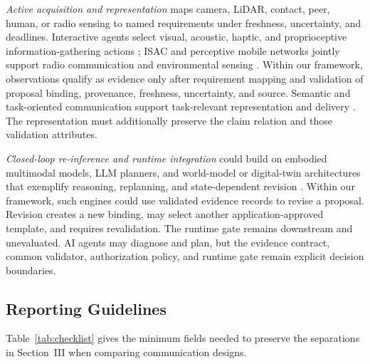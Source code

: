 \emph{Active acquisition and representation} maps camera, LiDAR, contact, peer,
human, or radio sensing to named requirements under freshness, uncertainty, and
deadlines. Interactive agents select visual, acoustic, haptic, and
proprioceptive information-gathering actions \cite{chatenv}; ISAC and perceptive
mobile networks jointly support radio communication and environmental sensing
\cite{rahmanperceptive,liu}. Within our framework, observations qualify as
evidence only after requirement mapping and validation of proposal binding,
provenance, freshness, uncertainty, and source. Semantic and task-oriented
communication support task-relevant representation and delivery
\cite{gunduz,pragcomm}. The representation must additionally preserve the claim
relation and those validation attributes.

\emph{Closed-loop re-inference and runtime integration} could build on embodied
multimodal models, LLM planners, and world-model or digital-twin architectures
that exemplify reasoning, replanning, and state-dependent revision
\cite{palme,innermonologue,wmcdt}. Within our framework, such engines could use
validated evidence records to revise a proposal. Revision creates a new
binding, may select another application-approved template, and requires
revalidation. The runtime gate remains downstream and unevaluated. AI agents
may diagnose and plan, but the evidence contract, common validator,
authorization policy, and runtime gate remain explicit decision boundaries.

\subsection{Reporting Guidelines}

Table~\ref{tab:checklist} gives the minimum fields needed to preserve the
separations in Section~III when comparing communication designs.

